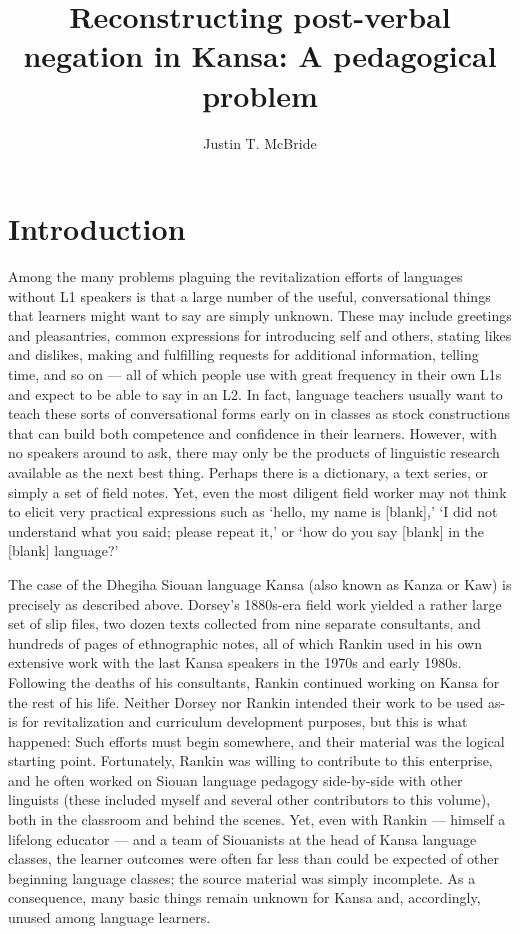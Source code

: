 \documentclass[output=paper]{LSP/langsci}
\author{Justin T. McBride}
\title{Reconstructing post-verbal negation in Kansa: A pedagogical problem}
\begin{document}
\section{Introduction}
Among the many problems plaguing the revitalization efforts of languages without L1 speakers is that a large number of the useful, conversational things that learners might want to say are simply unknown. These may include greetings and pleasantries, common expressions for introducing self and others, stating likes and dislikes, making and fulfilling requests for additional information, telling time, and so on --- all of which people use with great frequency in their own L1s and expect to be able to say in an L2. In fact, language teachers usually want to teach these sorts of conversational forms early on in classes as stock constructions that can build both competence and confidence in their learners. However, with no speakers around to ask, there may only be the products of linguistic research available as the next best thing. Perhaps there is a dictionary, a text series, or simply a set of field notes. Yet, even the most diligent field worker may not think to elicit very practical expressions such as `hello, my name is [blank],' `I did not understand what you said; please repeat it,' or `how do you say [blank] in the [blank] language?' 

The case of the Dhegiha Siouan language Kansa (also known as Kanza or Kaw) is precisely as described above. Dorsey's 1880s-era field work yielded a rather large set of slip files, two dozen texts collected from nine separate consultants, and hundreds of pages of ethnographic notes, all of which Rankin used in his own extensive work with the last Kansa speakers in the 1970s and early 1980s. Following the deaths of his consultants, Rankin continued working on Kansa for the rest of his life. Neither Dorsey nor Rankin intended their work to be used as-is for revitalization and curriculum development purposes, but this is what happened: Such efforts must begin somewhere, and their material was the logical starting point. Fortunately, Rankin was willing to contribute to this enterprise, and he often worked on Siouan language pedagogy side-by-side with other linguists (these included myself and several other contributors to this volume), both in the classroom and behind the scenes. Yet, even with Rankin --- himself a lifelong educator --- and a team of Siouanists at the head of Kansa language classes, the learner outcomes were often far less than could be expected of other beginning language classes; the source material was simply incomplete. As a consequence, many basic things remain unknown for Kansa and, accordingly, unused among language learners.
\end{document}
